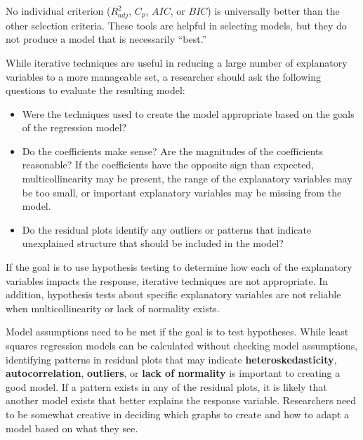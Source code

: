 \documentclass[
]{book}
\providecommand{\tightlist}{%
  \setlength{\itemsep}{0pt}\setlength{\parskip}{0pt}}
\begin{document}
No individual criterion (\(R^2_{adj}\), \(C_p\), \(AIC\), or \(BIC\)) is universally better than the other selection criteria. These tools are helpful in selecting models, but they do not produce a model that is necessarily ``best.''

While iterative techniques are useful in reducing a large number of explanatory variables to a more manageable set, a researcher should ask the following questions to evaluate the resulting model:

\begin{itemize}
\tightlist
\item
  Were the techniques used to create the model appropriate based on the goals of the regression model?
\item
  Do the coefficients make sense? Are the magnitudes of the coefficients reasonable? If the coefficients have the opposite sign than expected, multicollinearity may be present, the range of the explanatory variables may be too small, or important explanatory variables may be missing from the model.
\item
  Do the residual plots identify any outliers or patterns that indicate unexplained structure that should be included in the model?
\end{itemize}

If the goal is to use hypothesis testing to determine how each of the explanatory variables impacts the response, iterative techniques are not appropriate. In addition, hypothesis tests about specific explanatory variables are not reliable when multicollinearity or lack of normality exists.

Model assumptions need to be met if the goal is to test hypotheses. While least squares regression models can be calculated without checking model assumptions, identifying patterns in residual plots that may indicate \textbf{heteroskedasticity}, \textbf{autocorrelation}, \textbf{outliers}, or \textbf{lack of normality} is important to creating a good model. If a pattern exists in any of the residual plots, it is likely that another model exists that better explains the response variable. Researchers need to be somewhat creative in deciding which graphs to create and how to adapt a model based on what they see.
\end{document}
